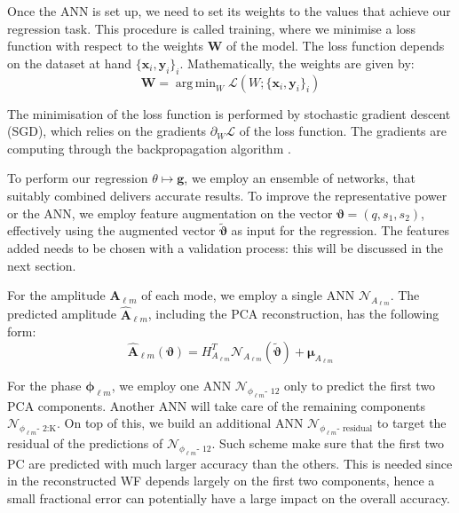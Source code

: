 \documentclass[twocolumn,showpacs,preprintnumbers,nofootinbib,prd,
superscriptaddress,10pt]{revtex4-1}
\DeclareMathOperator*{\argmin}{arg\,min}
\begin{document}
Once the ANN is set up, we need to set its weights to the values that achieve our regression task.
This procedure is called training, where we minimise a loss function with respect to the weights $\boldsymbol{W}$ of the model.
The loss function depends on the dataset at hand ${\{\boldsymbol{x}_i, \boldsymbol{y}_i\}_i}$.
Mathematically, the weights are given by:
%
\begin{equation}\label{eq:loss_general}
	\boldsymbol{W} = \argmin_W \mathcal{L}(W; \{\boldsymbol{x}_i, \boldsymbol{y}_i\}_i)
\end{equation}

The minimisation of the loss function is performed by stochastic gradient descent (SGD), which relies on the gradients $\partial_W \mathcal{L}$ of the loss function. The gradients are computing through the backpropagation algorithm \cite{}.

To perform our regression $\theta \longmapsto \boldsymbol{g}$, we employ an ensemble of networks, that suitably combined delivers accurate results.
To improve the representative power or the ANN, we employ feature augmentation on the vector $\boldsymbol{\vartheta} = (q, s_1, s_2)$, effectively using the augmented vector $\tilde{\boldsymbol{\vartheta}}$ as input for the regression. The features added needs to be chosen with a validation process: this will be discussed in the next section.

For the amplitude $\boldsymbol{A}_{\ell m}$ of each mode, we employ a single ANN $\mathcal{N}_{A_{\ell m}}$.
The predicted amplitude $\hat{\boldsymbol{A}}_{\ell m}$, including the PCA reconstruction, has the following form:
\begin{equation}
	\hat{\boldsymbol{A}}_{\ell m}(\boldsymbol{\vartheta}) = H_{A_{\ell m}}^T \mathcal{N}_{A_{\ell m}}(\tilde{\boldsymbol{\vartheta}}) + \boldsymbol{\mu}_{A_{\ell m}}
\end{equation}

For the phase $\boldsymbol{\phi}_{\ell m}$, we employ one ANN $\mathcal{N}_{\phi_{\ell m}\text{- 12}}$ only to predict the first two PCA components.
Another ANN will take care of the remaining components $\mathcal{N}_{\phi_{\ell m}\text{- 2:K}}$.
On top of this, we build an additional ANN $\mathcal{N}_{\phi_{\ell m}\text{- residual}}$ to target the residual of the predictions of $\mathcal{N}_{\phi_{\ell m}\text{- 12}}$.
Such scheme make sure that the first two PC are predicted with much larger accuracy than the others. This is needed since in the reconstructed WF depends largely on the first two components, hence a small fractional error can potentially have a large impact on the overall accuracy.
\end{document}
